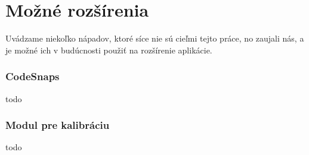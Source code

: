 \section{Možné rozšírenia}
Uvádzame niekoľko nápadov, ktoré síce nie sú cieľmi tejto práce, no zaujali nás, a je možné ich v budúcnosti použiť na rozšírenie aplikácie.

\subsubsection{CodeSnaps}
todo

\subsubsection{Modul pre kalibráciu}
todo
